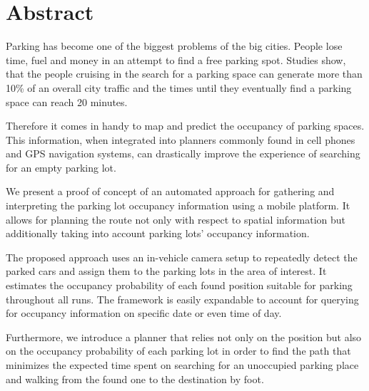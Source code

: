 \chapter*{Abstract}
\label{cha:abstract}

Parking has become one of the biggest problems of the big cities. People lose
time, fuel and money in an attempt to find a free parking spot. Studies show,
that the people cruising in the search for a parking space can generate more
than 10\% of an overall city traffic and the times until they eventually find
a parking space can reach 20 minutes.

Therefore it comes in handy to map and predict the occupancy of parking
spaces. This information, when integrated into planners commonly found in cell
phones and GPS navigation systems, can drastically improve the experience of
searching for an empty parking lot.

We present a proof of concept of an automated approach for gathering and
interpreting the parking lot occupancy information using a mobile platform. It
allows for planning the route not only with respect to spatial information but
additionally taking into account parking lots' occupancy information.

The proposed approach uses an in-vehicle camera setup to repeatedly detect the
parked cars and assign them to the parking lots in the area of interest. It
estimates the occupancy probability of each found position suitable for
parking throughout all runs. The framework is easily expandable to account for
querying for occupancy information on specific date or even time of day.

Furthermore, we introduce a planner that relies not only on the position but
also on the occupancy probability of each parking lot in order to find the
path that minimizes the expected time spent on searching for an unoccupied
parking place and walking from the found one to the destination by foot.



